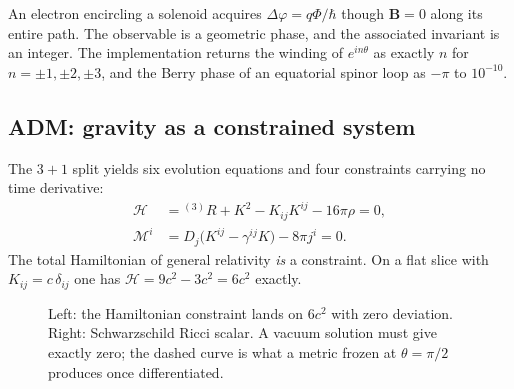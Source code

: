 \documentclass[11pt,a4paper]{article}
\theoremstyle{plain}
\theoremstyle{definition}
\begin{document}
An electron encircling a solenoid acquires $\Delta\varphi=q\Phi/\hbar$ though
$\bm B=0$ along its entire path. The observable is a geometric phase, and the
associated invariant is an integer. The implementation returns the winding of
$e^{in\theta}$ as exactly $n$ for $n=\pm1,\pm2,\pm3$, and the Berry phase of an
equatorial spinor loop as $-\pi$ to $10^{-10}$.

\subsection{ADM: gravity as a constrained system}

The $3{+}1$ split yields six evolution equations and four constraints carrying
no time derivative:
\begin{align}
\mathcal H &= {}^{(3)}\!R+K^2-K_{ij}K^{ij}-16\pi\rho = 0,\\
\mathcal M^i &= D_j\big(K^{ij}-\gamma^{ij}K\big)-8\pi j^i = 0 .
\end{align}
The total Hamiltonian of general relativity \emph{is} a constraint. On a flat
slice with $K_{ij}=c\,\delta_{ij}$ one has $\mathcal H=9c^2-3c^2=6c^2$ exactly.

\begin{figure}[h]
\centering
{}
\hfill
{}
\caption{Left: the Hamiltonian constraint lands on $6c^2$ with zero deviation.
Right: Schwarzschild Ricci scalar. A vacuum solution must give exactly zero; the
dashed curve is what a metric frozen at $\theta=\pi/2$ produces once
differentiated.}
\label{fig:adm}
\end{figure}
\end{document}
